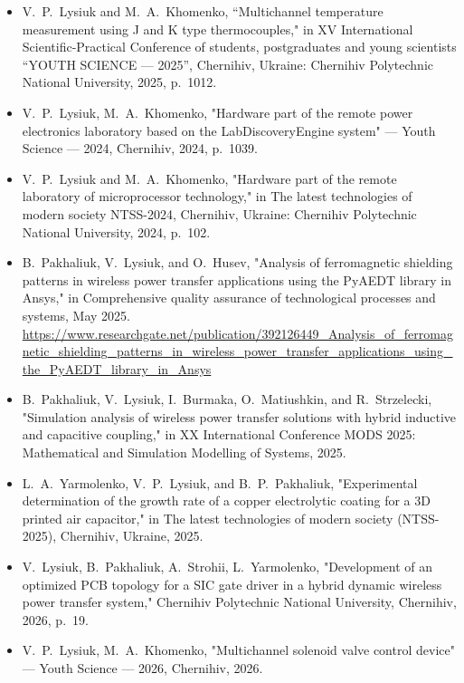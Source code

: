 \documentclass[11pt,a4paper]{article}
\newenvironment{points}
  {\begin{itemize}[leftmargin=14pt, itemsep=1.5pt, topsep=2pt, parsep=0pt,
                   label=\textbullet]}
  {\end{itemize}}
\begin{document}
\begin{points}
  \item V.~P.~Lysiuk and M.~A.~Khomenko, “Multichannel temperature measurement using J and K type
        thermocouples," in XV International Scientific-Practical Conference of students, postgraduates
        and young scientists “YOUTH SCIENCE --- 2025”, Chernihiv, Ukraine: Chernihiv Polytechnic
        National University, 2025, p.~1012.
  \item V.~P.~Lysiuk, M.~A.~Khomenko, "Hardware part of the remote power electronics laboratory based
        on the LabDiscoveryEngine system" --- Youth Science --- 2024, Chernihiv, 2024, p.~1039.
  \item V.~P.~Lysiuk and M.~A.~Khomenko, "Hardware part of the remote laboratory of microprocessor
        technology," in The latest technologies of modern society NTSS-2024, Chernihiv, Ukraine:
        Chernihiv Polytechnic National University, 2024, p.~102.
  \item B.~Pakhaliuk, V.~Lysiuk, and O.~Husev, "Analysis of ferromagnetic shielding patterns in wireless
        power transfer applications using the PyAEDT library in Ansys," in Comprehensive quality
        assurance of technological processes and systems, May 2025.\\
        {\footnotesize\url{https://www.researchgate.net/publication/392126449_Analysis_of_ferromagnetic_shielding_patterns_in_wireless_power_transfer_applications_using_the_PyAEDT_library_in_Ansys}}
  \item B.~Pakhaliuk, V.~Lysiuk, I.~Burmaka, O.~Matiushkin, and R.~Strzelecki, "Simulation analysis of
        wireless power transfer solutions with hybrid inductive and capacitive coupling," in XX
        International Conference MODS 2025: Mathematical and Simulation Modelling of Systems, 2025.
  \item L.~A.~Yarmolenko, V.~P.~Lysiuk, and B.~P.~Pakhaliuk, "Experimental determination of the growth
        rate of a copper electrolytic coating for a 3D printed air capacitor," in The latest technologies
        of modern society (NTSS-2025), Chernihiv, Ukraine, 2025.
  \item V.~Lysiuk, B.~Pakhaliuk, A.~Strohii, L.~Yarmolenko, "Development of an optimized PCB topology
        for a SIC gate driver in a hybrid dynamic wireless power transfer system," Chernihiv Polytechnic
        National University, Chernihiv, 2026, p.~19.
  \item V.~P.~Lysiuk, M.~A.~Khomenko, "Multichannel solenoid valve control device" ---
        Youth Science --- 2026, Chernihiv, 2026.
\end{points}
\end{document}
